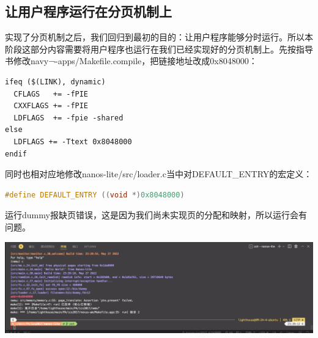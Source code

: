 \documentclass[UTF8,a4paper,10pt]{ctexart}
\begin{document}
\subsection{让用户程序运行在分页机制上}
实现了分页机制之后，我们回归到最初的目的：让用户程序能够分时运行。所以本阶段这部分内容需要将用户程序也运行在我们已经实现好的分页机制上。先按指导书修改navy¬-apps/Makefile.compile，把链接地址改成0x8048000：
\begin{lstlisting}
ifeq ($(LINK), dynamic)
  CFLAGS   += -fPIE
  CXXFLAGS += -fPIE
  LDFLAGS  += -fpie -shared
else
  LDFLAGS += -Ttext 0x8048000
endif
\end{lstlisting}
同时也相对应地修改nanos-lite/src/loader.c当中对DEFAULT\_ENTRY的宏定义：
\begin{lstlisting}[language = C++]
#define DEFAULT_ENTRY ((void *)0x8048000)
\end{lstlisting}
运行dummy报缺页错误，这是因为我们尚未实现页的分配和映射，所以运行会有问题。
\begin{center}
  \includegraphics*[scale = 0.2]{img/6}
\end{center}
\end{document}
